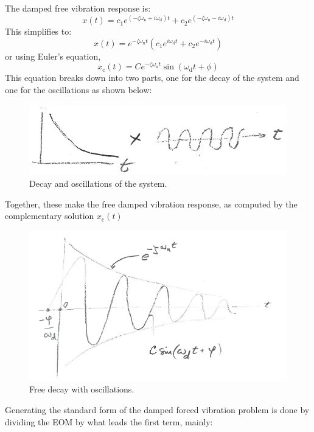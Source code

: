 \documentclass[12pt,letter]{article}
\numberwithin{ex}{section} %
\numberwithin{re}{section} %
\numberwithin{equation}{section}	%
\begin{document}
The damped free vibration response is:
\begin{equation}
	x(t) = c_1 e^{(-\zeta \omega_\text{n} + i \omega_\text{d})t} + c_2 e^{(-\zeta \omega_\text{n} -i \omega_d)t}
\end{equation} 
This simplifies to:
\begin{equation}
	x(t) = e^{-\zeta \omega_\text{n} t} (c_1 e^{i \omega_\text{d}t} + c_2 e^{-i \omega_\text{d}t} )
\end{equation}
or using Euler's equation, 
\begin{equation}
x_\text{c}(t) = C e^{-\zeta \omega_\text{n} t} \sin (\omega_\text{d} t + \phi)
\end{equation}
This equation breaks down into two parts, one for the decay of the system and one for the oscillations as shown below:
\begin{figure}[H]
	\centering
	\includegraphics[width=5in]{../figures/decay_and_oscillations.png}
	\caption{Decay and oscillations of the system.}
\end{figure}
Together, these make the free damped vibration response, as computed by the complementary solution $x_\text{c}(t)$
\begin{figure}[H]
	\centering
	\includegraphics[width=5in]{../figures/free_decay_with_oscillations.png}
	\caption{Free decay with oscillations.}
\end{figure}
Generating the standard form of the damped forced vibration problem is done by dividing the EOM by what leads the first term, mainly:
\end{document}
